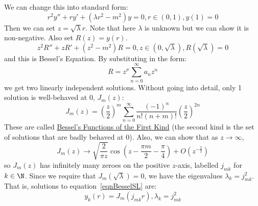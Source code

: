 \documentclass[../Main.tex]{subfiles}
\begin{document}
We can change this into standard form:
\begin{equation}
    r^2 y'' + ry' + \left(\lambda r^2 - m^2\right)y = 0, r\in(0, 1), y(1) = 0
    \label{eqnBesselStd}
\end{equation}
Then we can set $z = \sqrt{\lambda} r$. Note that here $\lambda$ is unknown but we can show it is non-negative. Also set $R(z) = y(r)$.
\begin{equation}
    z^2 R'' + zR' + (z^2 - m^2)R = 0, z \in (0, \sqrt{\lambda}), R(\sqrt{\lambda}) = 0
    \label{eqnBessel}
\end{equation}
and this is Bessel's Equation. By substituting in the form:
\begin{equation*}
    R = z^\sigma \sum_{n=0}^{\infty} a_n z^n
\end{equation*}
we get two linearly independent solutions. Without going into detail, only 1 solution is well-behaved at 0, $J_m(z)$:
\begin{equation}
    J_m(z) = \left(\frac{z}{2}\right)^m \sum_{n=0}^{\infty} \frac{(-1)^n}{n!(n+m)!} \left(\frac{z}{2}\right)^{2n}
    \label{eqnBesselSoln}
\end{equation}
These are called \underline{Bessel's Functions of the First Kind} (the second kind is the set of solutions that are badly behaved at 0).
Also, we can show that as $z \to \infty$,
\begin{equation*}
    J_m(z) \to \sqrt{\frac{2}{\pi z}} \cos\left(z - \frac{\pi m}{2} - \frac{\pi}{4}\right) + O(z^{-\frac{3}{2}})
\end{equation*}
so $J_m(z)$ has infinitely many zeroes on the positive $z$-axis, labelled $j_{mk}$ for $k \in \N$. Since we require that $J_m(\sqrt{\lambda}) = 0$, we have the eigenvalues $\lambda_k = j_{mk}^2$. That is, solutions to equation~\ref{eqnBesselSL} are:
\begin{equation}
    y_k(r) = J_m(j_{mk}r), \lambda_k = j_{mk}^2
    \label{eqnBesselSLSoln}
\end{equation}
\end{document}
